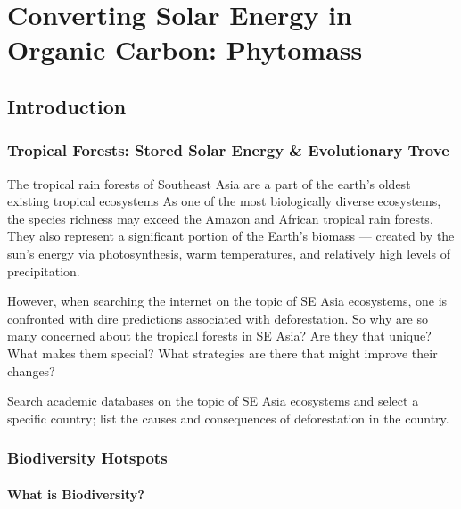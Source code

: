 \chapter[Phytomass]{Converting Solar Energy in Organic Carbon: Phytomass}

\section{Introduction}

\subsection{Tropical Forests: Stored Solar Energy \& Evolutionary Trove}

The tropical rain forests of Southeast Asia are a part of the earth's oldest existing tropical ecosystems As one of the most biologically diverse ecosystems, the species richness may exceed the Amazon and African tropical rain forests. They also represent a significant portion of the Earth's biomass --- created by the sun's energy via photosynthesis, warm temperatures, and relatively high levels of precipitation.

However, when searching the internet on the topic of SE Asia ecosystems, one is confronted with dire predictions associated with deforestation. So why are so many concerned about the tropical forests in SE Asia? Are they that unique? What makes them special? What strategies are there that might improve their changes?

\begin{exercise}
Search academic databases on the topic of SE Asia ecosystems and select a specific country; list the causes and consequences of deforestation in the country. 
\end{exercise}

\subsection{Biodiversity Hotspots}

\subsubsection{What is Biodiversity?}


